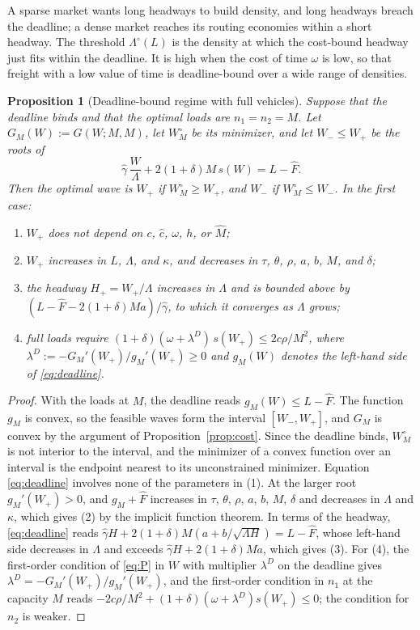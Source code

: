 \documentclass[10pt, reqno]{amsart}
\newtheorem{proposition}{Proposition}
\theoremstyle{definition}
\begin{document}
A sparse market wants long headways to build density, and long headways breach the deadline; a dense market reaches its routing economies within a short headway. The threshold $\Lambda^\circ(L)$ is the density at which the cost-bound headway just fits within the deadline. It is high when the cost of time $\omega$ is low, so that freight with a low value of time is deadline-bound over a wide range of densities.

\begin{proposition}[Deadline-bound regime with full vehicles]\label{prop:deadline}
Suppose that the deadline binds and that the optimal loads are $n_1=n_2=M$. Let $G_M(W):=G(W;M,M)$, let $W_M^\circ$ be its minimizer, and let $W_-\le W_+$ be the roots of
\begin{equation}\label{eq:deadline}
\hat\gamma\,\frac W\Lambda+2(1+\delta)M\,s(W)=L-\hat F .
\end{equation}
Then the optimal wave is $W_+$ if $W_M^\circ\ge W_+$, and $W_-$ if $W_M^\circ\le W_-$. In the first case:
\begin{enumerate}
\item $W_+$ does not depend on $c$, $\hat c$, $\omega$, $h$, or $\hat M$;
\item $W_+$ increases in $L$, $\Lambda$, and $\kappa$, and decreases in $\tau$, $\theta$, $\rho$, $a$, $b$, $M$, and $\delta$;
\item the headway $H_+=W_+/\Lambda$ increases in $\Lambda$ and is bounded above by $(L-\hat F-2(1+\delta)Ma)/\hat\gamma$, to which it converges as $\Lambda$ grows;
\item full loads require $(1+\delta)(\omega+\lambda^D)\,s(W_+)\le 2c\rho/M^2$, where $\lambda^D:=-G_M'(W_+)/g_M'(W_+)\ge0$ and $g_M(W)$ denotes the left-hand side of \eqref{eq:deadline}.
\end{enumerate}
\end{proposition}

\begin{proof}
With the loads at $M$, the deadline reads $g_M(W)\le L-\hat F$. The function $g_M$ is convex, so the feasible waves form the interval $[W_-,W_+]$, and $G_M$ is convex by the argument of Proposition~\ref{prop:cost}. Since the deadline binds, $W_M^\circ$ is not interior to the interval, and the minimizer of a convex function over an interval is the endpoint nearest to its unconstrained minimizer. Equation \eqref{eq:deadline} involves none of the parameters in (1). At the larger root $g_M'(W_+)>0$, and $g_M+\hat F$ increases in $\tau$, $\theta$, $\rho$, $a$, $b$, $M$, $\delta$ and decreases in $\Lambda$ and $\kappa$, which gives (2) by the implicit function theorem. In terms of the headway, \eqref{eq:deadline} reads $\hat\gamma H+2(1+\delta)M(a+b/\sqrt{\Lambda H})=L-\hat F$, whose left-hand side decreases in $\Lambda$ and exceeds $\hat\gamma H+2(1+\delta)Ma$, which gives (3). For (4), the first-order condition of \eqref{eq:P} in $W$ with multiplier $\lambda^D$ on the deadline gives $\lambda^D=-G_M'(W_+)/g_M'(W_+)$, and the first-order condition in $n_1$ at the capacity $M$ reads $-2c\rho/M^2+(1+\delta)(\omega+\lambda^D)s(W_+)\le0$; the condition for $n_2$ is weaker.
\end{proof}
\end{document}
